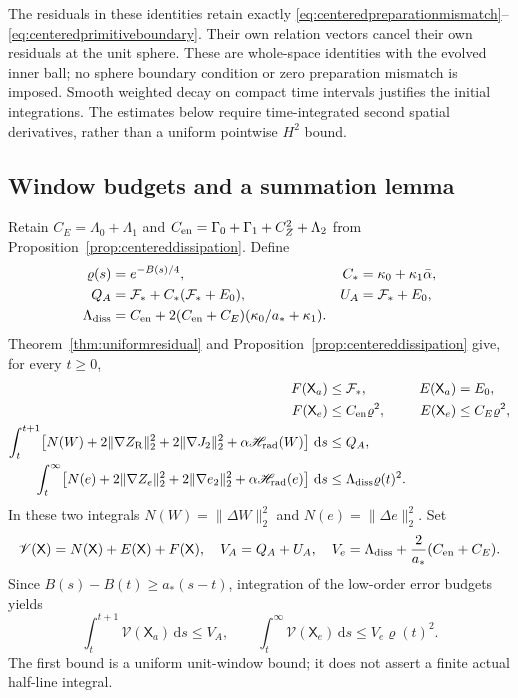\documentclass[11pt]{article}
\numberwithin{equation}{section}
\newcommand{\dd}{\,\mathrm d}
\begin{document}
The residuals in these identities retain exactly
\eqref{eq:centeredpreparationmismatch}--\eqref{eq:centeredprimitiveboundary}.
Their own relation vectors cancel their own residuals at the unit
sphere. These are whole-space identities with the evolved inner ball;
no sphere boundary condition or zero preparation mismatch is imposed.
Smooth weighted decay on compact time intervals justifies the initial
integrations. The estimates below require time-integrated second
spatial derivatives, rather than a uniform pointwise $H^2$ bound.

\subsection{Window budgets and a summation lemma}

Retain $C_E=\Lambda_0+\Lambda_1$ and
$C_{\rm en}=\Gamma_0+\Gamma_1+C_Z^2+\Lambda_2$ from
Proposition~\ref{prop:centereddissipation}. Define
\begin{align}
 \varrho(s)&=e^{-B(s)/4},&
 C_*&=\kappa_0+\kappa_1\bar\alpha,\nonumber\\
 Q_A&=\mathcal F_*+C_*(\mathcal F_*+E_0),&
 U_A&=\mathcal F_*+E_0,\nonumber\\
 \Lambda_{\rm diss}
  &=C_{\rm en}+2(C_{\rm en}+C_E)(\kappa_0/a_*+\kappa_1).
 &&\label{r13:transferbudgets}
\end{align}
Theorem~\ref{thm:uniformresidual} and
Proposition~\ref{prop:centereddissipation} give, for every $t\ge0$,
\begin{align}
 F(\mathsf X_a)&\le\mathcal F_*,&E(\mathsf X_a)&=E_0,
 \nonumber\\
 F(\mathsf X_e)&\le C_{\rm en}\varrho^2,&
 E(\mathsf X_e)&\le C_E\varrho^2,
 \label{r13:pointwisebudgets}\\
 \int_t^{t+1}\!\left[N(W)+2\|\nabla Z_{\mathrm R}\|_2^2
        +2\|\nabla J_2\|_2^2+\alpha\mathscr H_{\rm rad}(W)\right]\dd s
 &\le Q_A,\nonumber\\
 \int_t^\infty\!\left[N(e)+2\|\nabla Z_e\|_2^2
        +2\|\nabla e_2\|_2^2+\alpha\mathscr H_{\rm rad}(e)\right]\dd s
 &\le\Lambda_{\rm diss}\varrho(t)^2.
 \label{r13:retainedbudgets}
\end{align}
In these two integrals $N(W)=\|\Delta W\|_2^2$ and
$N(e)=\|\Delta e\|_2^2$. Set
\begin{equation}\label{r13:augmentednorm}
 \mathscr V(\mathsf X)=N(\mathsf X)+E(\mathsf X)+F(\mathsf X),
 \quad V_A=Q_A+U_A,\quad
 V_e=\Lambda_{\rm diss}+\frac2{a_*}(C_{\rm en}+C_E).
\end{equation}
Since $B(s)-B(t)\ge a_*(s-t)$, integration of the low-order error
budgets yields
\begin{equation}\label{r13:augmentedbudgets}
 \int_t^{t+1}\mathscr V(\mathsf X_a)\dd s\le V_A,
 \qquad
 \int_t^\infty\mathscr V(\mathsf X_e)\dd s
                         \le V_e\varrho(t)^2.
\end{equation}
The first bound is a uniform unit-window bound; it does not assert a
finite actual half-line integral.
\end{document}
